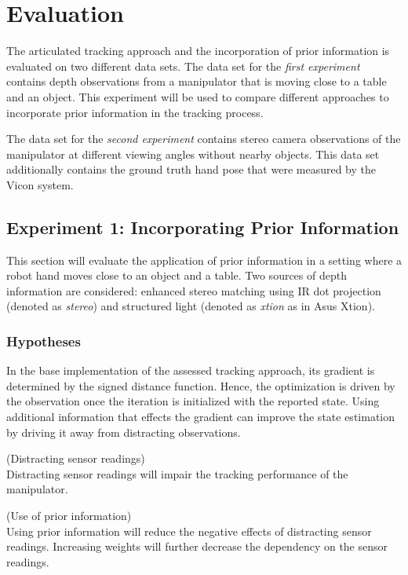 \chapter{Evaluation}
\label{sec:evaluation}

The articulated tracking approach and the incorporation of prior information is evaluated on two different data sets. The data set for the \textit{first experiment} contains depth observations from a manipulator that is moving close to a table and an object. This experiment will be used to compare different approaches to incorporate prior information in the tracking process.

The data set for the \textit{second experiment} contains stereo camera observations of the manipulator at different viewing angles without nearby objects. This data set additionally contains the ground truth hand pose that were measured by the Vicon system.

\section{Experiment 1: Incorporating Prior Information}

This section will evaluate the application of prior information in a setting where a robot hand moves close to an object and a table. Two sources of depth information are considered: enhanced stereo matching using IR dot projection (denoted as \emph{stereo}) and structured light (denoted as \emph{xtion} as in Asus Xtion).

\subsection{Hypotheses}

In the base implementation of the assessed tracking approach, its gradient is determined by the signed distance function. Hence, the optimization is driven by the observation once the iteration is initialized with the reported state. Using additional information that effects the gradient can improve the state estimation by driving it away from distracting observations.

\begin{hypothesis}(Distracting sensor readings)\\
Distracting sensor readings will impair the tracking performance of the manipulator.
\label{hyp:distracting_readings}
\end{hypothesis}

\begin{hypothesis}(Use of prior information)\\
Using prior information will reduce the negative effects of distracting sensor readings. Increasing weights will further decrease the dependency on the sensor readings.
\label{hyp:prior_information}
\end{hypothesis}


